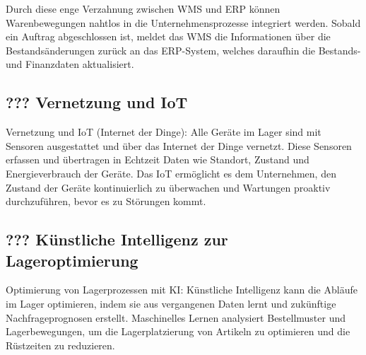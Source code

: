 Durch diese enge Verzahnung zwischen WMS und ERP können Warenbewegungen nahtlos in die Unternehmensprozesse integriert werden. Sobald ein Auftrag abgeschlossen ist, meldet das WMS die Informationen über die Bestandsänderungen zurück an das ERP-System, welches daraufhin die Bestands- und Finanzdaten aktualisiert.

\subsection{??? Vernetzung und IoT}
Vernetzung und IoT (Internet der Dinge): Alle Geräte im Lager sind mit Sensoren ausgestattet und über das Internet der Dinge vernetzt. Diese Sensoren erfassen und übertragen in Echtzeit Daten wie Standort, Zustand und Energieverbrauch der Geräte. Das IoT ermöglicht es dem Unternehmen, den Zustand der Geräte kontinuierlich zu überwachen und Wartungen proaktiv durchzuführen, bevor es zu Störungen kommt.

\subsection{??? Künstliche Intelligenz zur Lageroptimierung}
Optimierung von Lagerprozessen mit KI: Künstliche Intelligenz kann die Abläufe im Lager optimieren, indem sie aus vergangenen Daten lernt und zukünftige Nachfrageprognosen erstellt. Maschinelles Lernen analysiert Bestellmuster und Lagerbewegungen, um die Lagerplatzierung von Artikeln zu optimieren und die Rüstzeiten zu reduzieren.
